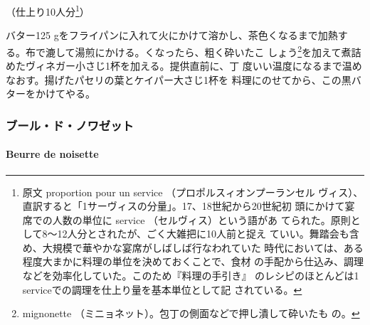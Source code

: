 \begin{recette}

（仕上り10人分\footnote{原文 proportion pour un service
  （プロポルスィオンプーランセル
  ヴィス）、直訳すると「1サーヴィスの分量」。17、18世紀から20世紀初
  頭にかけて宴席での人数の単位に service （セルヴィス）という語があ
  てられた。原則として8〜12人分とされたが、ごく大雑把に10人前と捉え
  ていい。舞踏会も含め、大規模で華やかな宴席がしばしば行なわれていた
  時代においては、ある程度大まかに料理の単位を決めておくことで、食材
  の手配から仕込み、調理などを効率化していた。このため『料理の手引き』
  のレシピのほとんどは1 serviceでの調理を仕上り量を基本単位として記
  されている。}）

バター125 gをフライパンに入れて火にかけて溶かし、茶色くなるまで加熱す
る。布で漉して湯煎にかける。くなったら、粗く砕いたこ
しょう\footnote{mignonette
  （ミニョネット）。包丁の側面などで押し潰して砕いたも の。}を加えて煮詰めたヴィネガー小さじ1杯を加える。提供直前に、丁
度いい温度になるまで温めなおす。揚げたパセリの葉とケイパー大さじ1杯を
料理にのせてから、この黒バターをかけてやる。

\maeaki

\hypertarget{ux30d6ux30fcux30ebux30c9ux30ceux30efux30bcux30c3ux30c8}{%
\subsubsection{ブール・ド・ノワゼット}\label{ux30d6ux30fcux30ebux30c9ux30ceux30efux30bcux30c3ux30c8}}

\hypertarget{beurre-de-noisette}{%
\paragraph{Beurre de noisette}\label{beurre-de-noisette}}



\end{recette}
